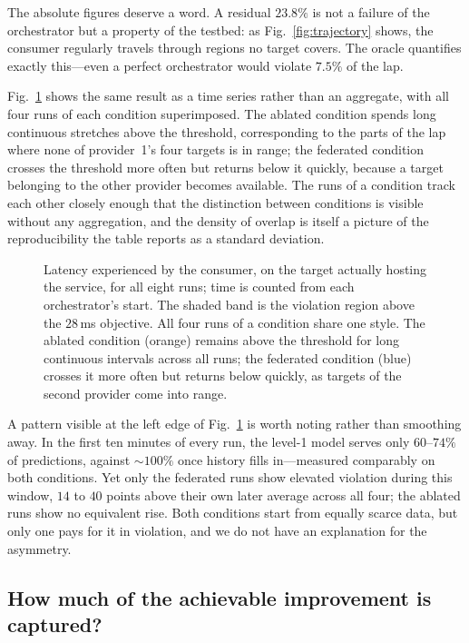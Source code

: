 \documentclass[conference]{IEEEtran}
\begin{document}
The absolute figures deserve a word. A residual $23.8\%$ is not a failure of
the orchestrator but a property of the testbed: as Fig.~\ref{fig:trajectory}
shows, the consumer regularly travels through regions no target covers. The
oracle quantifies exactly this---even a perfect orchestrator would violate
$7.5\%$ of the lap.

Fig.~\ref{fig:latency} shows the same result as a time series rather than an
aggregate, with all four runs of each condition superimposed. The ablated
condition spends long continuous stretches above the threshold, corresponding
to the parts of the lap where none of provider~1's four targets is in range;
the federated condition crosses the threshold more often but returns below it
quickly, because a target belonging to the other provider becomes available.
The runs of a condition track each other closely enough that the distinction
between conditions is visible without any aggregation, and the density of
overlap is itself a picture of the reproducibility the table reports as a
standard deviation.

\begin{figure}[t]
\centering
\resizebox{0.95\columnwidth}{!}{}
\caption{Latency experienced by the consumer, on the target actually hosting
the service, for all eight runs; time is counted from each orchestrator's
start. The shaded band is the violation region above the $28$\,ms objective.
All four runs of a condition share one style. The ablated condition (orange)
remains above the threshold for long continuous intervals across all runs;
the federated condition (blue) crosses it more often but returns below
quickly, as targets of the second provider come into range.}
\label{fig:latency}
\end{figure}

A pattern visible at the left edge of Fig.~\ref{fig:latency} is worth noting
rather than smoothing away. In the first ten minutes of every run, the
level-1 model serves only $60$--$74\%$ of predictions, against
$\sim\!100\%$ once history fills in---measured comparably on both
conditions. Yet only the federated runs show elevated violation during this
window, $14$ to $40$ points above their own later average across all four;
the ablated runs show no equivalent rise. Both conditions start from equally
scarce data, but only one pays for it in violation, and we do not have an
explanation for the asymmetry.

\subsection{How much of the achievable improvement is captured?}
\label{sec:achievable}
\end{document}
